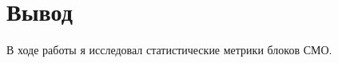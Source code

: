 \chapter{Вывод}
\label{ch:сhap5}

В ходе работы я исследовал статистические метрики блоков СМО.

\endinput